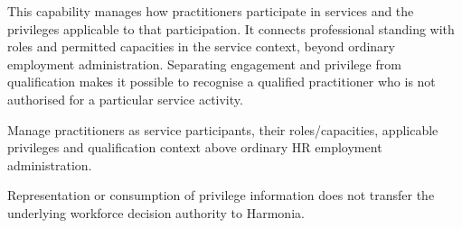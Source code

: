 This capability manages how practitioners participate in services and the privileges applicable to that participation. It connects professional standing with roles and permitted capacities in the service context, beyond ordinary employment administration. Separating engagement and privilege from qualification makes it possible to recognise a qualified practitioner who is not authorised for a particular service activity.



Manage practitioners as service participants, their roles/\allowbreak{}capacities, applicable privileges and qualification context above ordinary HR employment administration.



Representation or consumption of privilege information does not transfer the underlying workforce decision authority to Harmonia.


